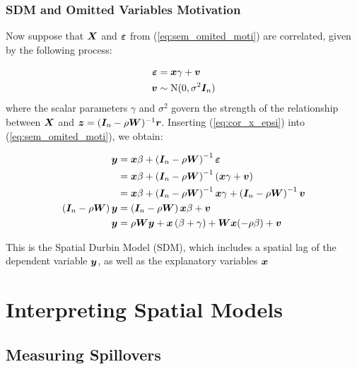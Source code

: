 \documentclass[english,10pt]{beamer}\usepackage[]{graphicx}\usepackage[]{xcolor}
\begin{document}
\begin{frame}
  \frametitle{SDM and Omitted Variables Motivation}
    Now suppose that $\bm X$ and $\bm {\varepsilon}$ from (\ref{eq:sem_omited_moti}) are correlated, given by the following process:

\begin{equation}\label{eq:cor_x_epsi}
\begin{aligned}
  \bm {\varepsilon} & = \bm x \gamma + \bm v \\
  \bm v    & \sim \mathrm{N}(0, \sigma^2\bm I_n) 
\end{aligned}
\end{equation}
%
where the scalar parameters $\gamma$ and $\sigma^2$ govern the strength of the relationship between $\bm X$ and $\bm z = (\bm I_n-\rho\bm W)^{-1}\bm r$. Inserting (\ref{eq:cor_x_epsi}) into (\ref{eq:sem_omited_moti}), we obtain:

\begin{equation}
  \begin{aligned}
    \bm y & = \bm x\beta + \left(\bm I_n - \rho\bm W\right)^{-1}\bm {\varepsilon} \\
        & = \bm x\beta + \left(\bm I_n - \rho\bm W\right)^{-1}\left(\bm x \gamma + \bm v\right) \\
        & = \bm x\beta + \left(\bm I_n - \rho\bm W\right)^{-1}\bm x \gamma + \left(\bm I_n - \rho\bm W\right)^{-1}\bm v \\
       \left(\bm I_n - \rho\bm W\right)\bm y & = \left(\bm I_n - \rho\bm W\right)\bm x\beta  + \bm v \\
       \bm y & = \rho\bm W\bm y + \bm x\left(\beta + \gamma\right) + \bm W\bm x(-\rho\beta) + \bm v
  \end{aligned}
\end{equation}

This is the Spatial Durbin Model (SDM), which includes a spatial lag of the dependent variable $\bm y$, as well as the explanatory variables $\bm x$
\end{frame}




\section{Interpreting Spatial Models}

\subsection{Measuring Spillovers}
\end{document}
